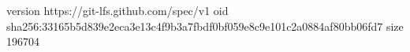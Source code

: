 version https://git-lfs.github.com/spec/v1
oid sha256:33165b5d839e2eca3e13c4f9b3a7fbdf0bf059e8c9e101c2a0884af80bb06fd7
size 196704
